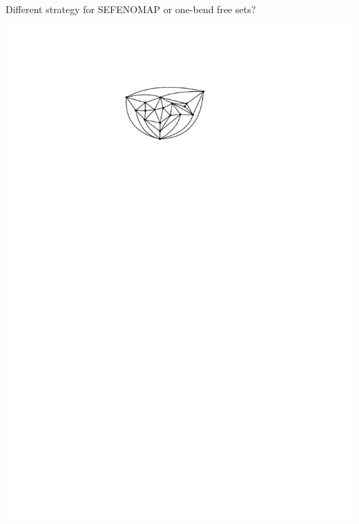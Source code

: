 \documentclass{beamer}
\begin{document}
\begin{frame}
Different strategy for SEFENOMAP or one-bend free sets?

  \begin{center}
    \includegraphics[page=13]{figs/walkthrough} \\

\end{center}
\end{frame}
\end{document}
